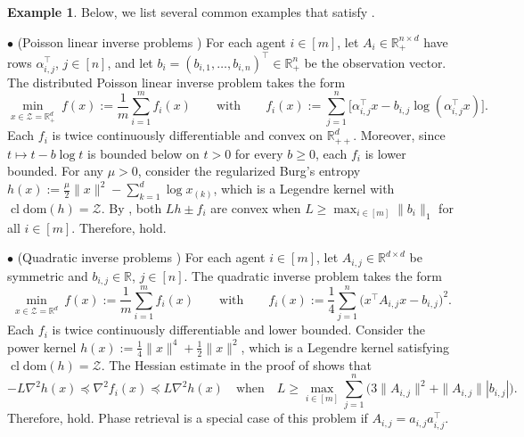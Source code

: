 \documentclass{article}
\theoremstyle{plain}
\theoremstyle{definition}
\newtheorem{example}[theorem]{Example}
\theoremstyle{remark}
\newcommand{\cl}{\operatorname{cl}}
\newcommand{\Rd}{\mathbb{R}^d}
\newcommand{\sL}{L}
\newcommand{\dom}[1]{\mathrm{dom}(#1)}
\begin{document}
\begin{example}
    Below, we list several common examples that satisfy .

\noindent $\bullet$ {(Poisson linear inverse problems \cite{bauschke2017descent})} For each agent $i\in[m]$, let $A_i\in\mathbb R_+^{n\times d}$ have rows $\alpha_{i,j}^\top$, $j\in[n]$, and let $b_i=(b_{i,1},\ldots,b_{i,n})^\top\in\mathbb R_+^n$ be the observation vector. The distributed Poisson linear inverse problem takes the form
    \[
        \min_{x\in\mathcal Z=\mathbb R_+^d}\ f(x):=\frac1m{\sum}_{i=1}^m f_i(x)
        \qquad \text{with} \qquad 
        f_i(x):={\sum}_{j=1}^n\big[\alpha_{i,j}^\top x-b_{i,j}\log (\alpha_{i,j}^\top x)\big].
    \]
    Each $f_i$ is twice continuously differentiable and convex on $\mathbb R_{++}^d$. Moreover, since $t\mapsto t-b\log t$ is bounded below on $t>0$ for every $b\geq0$, each $f_i$ is lower bounded. For any $\mu>0$, consider the regularized Burg's entropy
    $h(x):=\frac{\mu}{2}\|x\|^2-\sum_{k=1}^d\log x_{(k)}$, which is a Legendre kernel with $\cl\dom{h}=\mathcal Z$. By \cite[Lemma 7]{bauschke2017descent}, both $\sL h \pm f_i$ are convex when $\sL\geq\max_{i\in[m]}\|b_i\|_1$ for all $i\in[m]$. Therefore,  hold.

\noindent $\bullet$ {(Quadratic inverse problems \cite{bolte2018first})} For each agent $i\in[m]$, let $A_{i,j}\in\mathbb R^{d\times d}$ be symmetric and $b_{i,j}\in\mathbb R$, $j\in[n]$. The quadratic inverse problem takes the form
    \[
        \min_{x\in\mathcal Z=\Rd}\ f(x):=\frac1m{\sum}_{i=1}^m f_i(x)
        \qquad \text{with} \qquad
        f_i(x):=\frac14{\sum}_{j=1}^n\big(x^\top A_{i,j}x-b_{i,j}\big)^2.
    \]
    Each $f_i$ is twice continuously differentiable and lower bounded. Consider the power kernel $h(x):=\frac14\|x\|^4+\frac12\|x\|^2$, which is a Legendre kernel satisfying $\cl\dom{h}=\mathcal Z$. The Hessian estimate in the proof of \cite[Lemma~5.1]{bolte2018first} shows that 
    \[
        -\sL\nabla^2h(x)\preceq\nabla^2f_i(x)\preceq\sL\nabla^2h(x)
        \quad\text{when}\quad
        \sL\geq\max_{i\in[m]}{\sum}_{j=1}^n
        \big(3\|A_{i,j}\|^2+\|A_{i,j}\||b_{i,j}|\big).
    \]
    Therefore,  hold. Phase retrieval is a special case of this problem if $A_{i,j}=a_{i,j}a_{i,j}^\top$.


\end{example}
\end{document}
